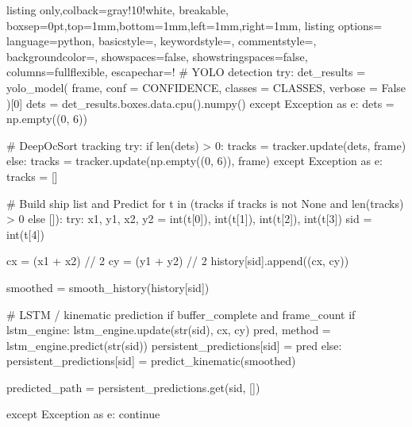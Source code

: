 \begin{tcblisting}{listing only,colback=gray!10!white, breakable, boxsep=0pt,top=1mm,bottom=1mm,left=1mm,right=1mm,
listing options={
language=python,
basicstyle=\small\ttfamily, 
keywordstyle=\color{blue}, 
commentstyle=\color{gray},
backgroundcolor=\color{gray!25},
showspaces=false,
showstringspaces=false,
columns=fullflexible,
escapechar=!}}
# YOLO detection 
try:
    det_results = yolo_model(
        frame,
        conf    = CONFIDENCE,
        classes = CLASSES,
        verbose = False
    )[0]
    dets = det_results.boxes.data.cpu().numpy()
except Exception as e:
    dets = np.empty((0, 6))

# DeepOcSort tracking
try:
    if len(dets) > 0:
        tracks = tracker.update(dets, frame)
    else:
        tracks = tracker.update(np.empty((0, 6)), frame)
except Exception as e:
    tracks = []

# Build ship list and Predict
for t in (tracks if tracks is not None and len(tracks) > 0 else []):
    try:
        x1, y1, x2, y2 = int(t[0]), int(t[1]), int(t[2]), int(t[3])
        sid            = int(t[4])

        cx = (x1 + x2) // 2
        cy = (y1 + y2) // 2
        history[sid].append((cx, cy))

        smoothed = smooth_history(history[sid])

        # LSTM / kinematic prediction
        if buffer_complete and frame_count %
            if lstm_engine:
                lstm_engine.update(str(sid), cx, cy)
                pred, method = lstm_engine.predict(str(sid))
                persistent_predictions[sid] = pred
            else:
                persistent_predictions[sid] = predict_kinematic(smoothed)
        
        predicted_path = persistent_predictions.get(sid, [])
        
    except Exception as e:
        continue
\end{tcblisting}
